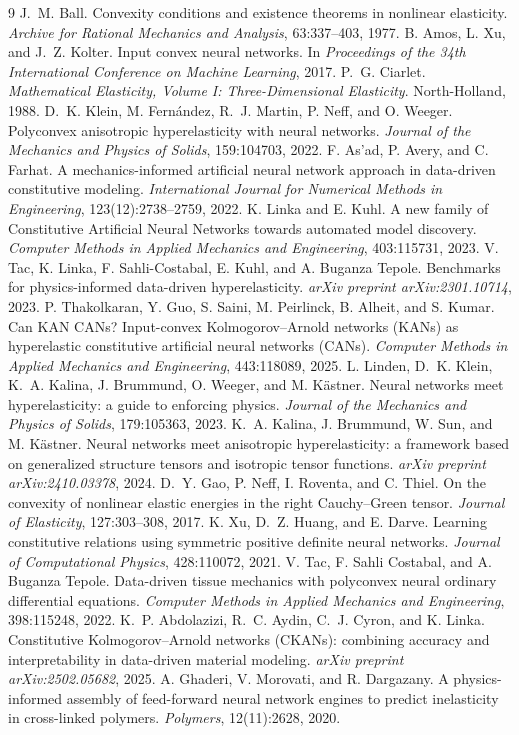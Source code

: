 \documentclass[10pt,a4paper]{article}
\begin{document}
\begin{thebibliography}{9}
J.~M. Ball. Convexity conditions and existence theorems in nonlinear
elasticity. \emph{Archive for Rational Mechanics and Analysis}, 63:337--403,
1977.
B. Amos, L. Xu, and J.~Z. Kolter. Input convex neural networks. In
\emph{Proceedings of the 34th International Conference on Machine Learning},
2017.
P.~G. Ciarlet. \emph{Mathematical Elasticity, Volume I: Three-Dimensional
Elasticity}. North-Holland, 1988.
D.~K. Klein, M. Fern\'andez, R.~J. Martin, P. Neff, and O. Weeger.
Polyconvex anisotropic hyperelasticity with neural networks.
\emph{Journal of the Mechanics and Physics of Solids}, 159:104703, 2022.
F. As'ad, P. Avery, and C. Farhat. A mechanics-informed artificial neural
network approach in data-driven constitutive modeling.
\emph{International Journal for Numerical Methods in Engineering},
123(12):2738--2759, 2022.
K. Linka and E. Kuhl. A new family of Constitutive Artificial Neural
Networks towards automated model discovery.
\emph{Computer Methods in Applied Mechanics and Engineering}, 403:115731,
2023.
V. Tac, K. Linka, F. Sahli-Costabal, E. Kuhl, and A. Buganza Tepole.
Benchmarks for physics-informed data-driven hyperelasticity.
\emph{arXiv preprint arXiv:2301.10714}, 2023.
P. Thakolkaran, Y. Guo, S. Saini, M. Peirlinck, B. Alheit, and S. Kumar.
Can KAN CANs? Input-convex Kolmogorov--Arnold networks (KANs) as
hyperelastic constitutive artificial neural networks (CANs).
\emph{Computer Methods in Applied Mechanics and Engineering}, 443:118089,
2025.
L. Linden, D.~K. Klein, K.~A. Kalina, J. Brummund, O. Weeger, and
M. K\"astner. Neural networks meet hyperelasticity: a guide to enforcing
physics. \emph{Journal of the Mechanics and Physics of Solids},
179:105363, 2023.
K.~A. Kalina, J. Brummund, W. Sun, and M. K\"astner. Neural networks meet
anisotropic hyperelasticity: a framework based on generalized structure
tensors and isotropic tensor functions.
\emph{arXiv preprint arXiv:2410.03378}, 2024.
D.~Y. Gao, P. Neff, I. Roventa, and C. Thiel. On the convexity of
nonlinear elastic energies in the right Cauchy--Green tensor.
\emph{Journal of Elasticity}, 127:303--308, 2017.
K. Xu, D.~Z. Huang, and E. Darve. Learning constitutive relations using
symmetric positive definite neural networks.
\emph{Journal of Computational Physics}, 428:110072, 2021.
V. Tac, F. Sahli Costabal, and A. Buganza Tepole. Data-driven tissue
mechanics with polyconvex neural ordinary differential equations.
\emph{Computer Methods in Applied Mechanics and Engineering}, 398:115248,
2022.
K.~P. Abdolazizi, R.~C. Aydin, C.~J. Cyron, and K. Linka. Constitutive
Kolmogorov--Arnold networks (CKANs): combining accuracy and
interpretability in data-driven material modeling.
\emph{arXiv preprint arXiv:2502.05682}, 2025.
A. Ghaderi, V. Morovati, and R. Dargazany. A physics-informed assembly of
feed-forward neural network engines to predict inelasticity in
cross-linked polymers. \emph{Polymers}, 12(11):2628, 2020.
\end{thebibliography}
\end{document}
